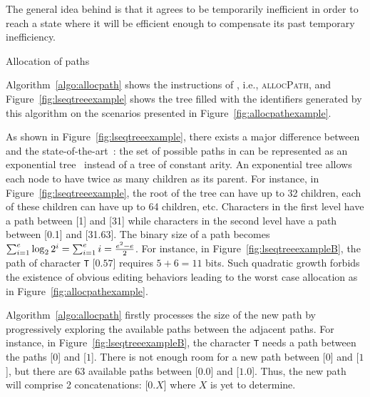 \noindent The general idea behind \LSEQ is that it agrees to be temporarily
inefficient in order to reach a state where it will be efficient enough to
compensate its past temporary inefficiency.


\begin{algorithm}

\caption{\label{algo:allocpath}Allocation of paths}
\end{algorithm}

Algorithm~\ref{algo:allocpath} shows the instructions of \LSEQ, i.e.,
\textsc{allocPath}, and Figure~\ref{fig:lseqtreeexample} shows the tree filled
with the identifiers generated by this algorithm on the scenarios presented in
Figure~\ref{fig:allocpathexample}.

As shown in Figure~\ref{fig:lseqtreeexample}, there exists a major difference
between \LSEQ and the state-of-the-art~\cite{preguica2009commutative,
  weiss2009logoot}: the set of possible paths in \LSEQ can be represented as an
exponential tree~\cite{andersson1996faster,andersson2007dynamic} instead of a
tree of constant arity. An exponential tree allows each node to have twice as
many children as its parent. For instance, in Figure~\ref{fig:lseqtreeexample},
the root of the tree can have up to 32 children, each of these children can have
up to 64 children, etc.
Characters in the first level have a path between [1] and [31] while characters
in the second level have a path between [0.1] and [31.63]. \noindent The binary
size of a path becomes
$\textstyle\sum\nolimits_{i=1}^{e}\log_2{2^i}=\sum\nolimits_{i=1}^{e}i=
{e^2-e\over{2}}$.
For instance, in Figure~\ref{fig:lseqtreeexampleB}, the path of character
\texttt{T} [$0.57$] requires $5 + 6 = 11$ bits.  Such quadratic growth forbids
the existence of obvious editing behaviors leading to the worst case allocation
as in Figure~\ref{fig:allocpathexample}.





Algorithm~\ref{algo:allocpath} firstly processes the size of the new path by
progressively exploring the available paths between the adjacent paths. For
instance, in Figure~\ref{fig:lseqtreeexampleB}, the character \texttt{T} needs a
path between the paths [$0$] and [$1$]. There is not enough room for a new path
between [$0$] and [$1$], but there are $63$ available paths
between [$0.0$] and [$1.0$]. Thus, the new path will comprise 2 concatenations:
[$0.X$] where $X$ is yet to determine.

